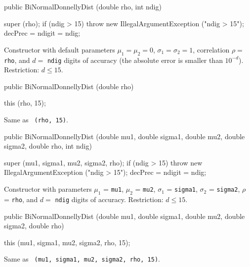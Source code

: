 \begin{code}

   public BiNormalDonnellyDist (double rho, int ndig) \begin{hide} {
       super (rho);
       if (ndig > 15)
          throw new IllegalArgumentException ("ndig > 15");
       decPrec = ndigit = ndig;
   }\end{hide}
\end{code}
\begin{tabb}
 Constructor with default  parameters
 $\mu_1 = \mu_2 = 0$, $\sigma_1 = \sigma_2 = 1$, correlation
 $\rho = $\texttt{ rho}, and $d = $ \texttt{ndig} digits of accuracy 
 (the absolute error is smaller than $10^{-d}$). Restriction: $d \le 15$.
  \end{tabb}
\begin{code}

   public BiNormalDonnellyDist (double rho) \begin{hide} {
       this (rho, 15);
   }\end{hide}
\end{code}
\begin{tabb}
  Same as ~\texttt{(rho, 15)}.
  \end{tabb}
\begin{code}

   public BiNormalDonnellyDist (double mu1, double sigma1, double mu2,
                                double sigma2, double rho, int ndig) \begin{hide} {
      super (mu1, sigma1, mu2, sigma2, rho);
      if (ndig > 15)
         throw new IllegalArgumentException ("ndig > 15");
      decPrec = ndigit = ndig;
   }\end{hide}
\end{code}
\begin{tabb}
  Constructor with parameters
  $\mu_1$ = \texttt{mu1}, $\mu_2$ = \texttt{mu2}, $\sigma_1$ = \texttt{sigma1}, 
 $\sigma_2$ = \texttt{sigma2}, $\rho$ = \texttt{rho}, and $d = $ \texttt{ndig}
  digits of accuracy. Restriction: $d \le 15$.
  \end{tabb}
\begin{code}

   public BiNormalDonnellyDist (double mu1, double sigma1, double mu2,
                                double sigma2, double rho) \begin{hide} {
      this (mu1, sigma1, mu2, sigma2, rho, 15);
   }\end{hide}
\end{code}
\begin{tabb}
  Same as ~\texttt{(mu1, sigma1, mu2, sigma2, rho, 15)}.
\end{tabb}


